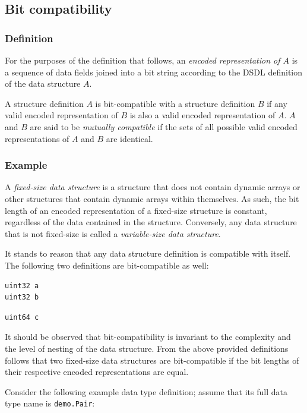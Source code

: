 \subsection{Bit compatibility}

\subsubsection{Definition}

For the purposes of the definition that follows, an \emph{encoded representation of $A$}
is a sequence of data fields joined into a bit string according to the DSDL definition
of the data structure $A$.

A structure definition $A$ is bit-compatible with a structure definition $B$
if any valid encoded representation of $B$ is also a valid encoded representation of $A$.
$A$ and $B$ are said to be \emph{mutually compatible} if the sets of all possible valid encoded representations of
$A$ and $B$ are identical.

\subsubsection{Example}

A \emph{fixed-size data structure} is a structure that does not contain dynamic arrays
or other structures that contain dynamic arrays within themselves.
As such, the bit length of an encoded representation of a fixed-size structure is constant,
regardless of the data contained in the structure.
Conversely, any data structure that is not fixed-size is called a \emph{variable-size data structure}.

It stands to reason that any data structure definition is compatible with itself.
The following two definitions are bit-compatible as well:

\begin{verbatim}
uint32 a
uint32 b
\end{verbatim}

\begin{verbatim}
uint64 c
\end{verbatim}

It should be observed that bit-compatibility is invariant to the complexity and the level of nesting
of the data structure.
From the above provided definitions follows that two fixed-size data structures are bit-compatible if the
bit lengths of their respective encoded representations are equal.

Consider the following example data type definition; assume that its full data type name is
\verb|demo.Pair|:

